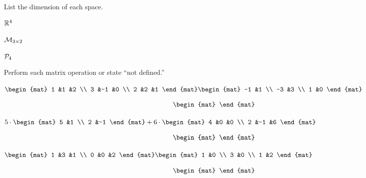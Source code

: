 \documentclass[11pt]{examjh}
\begin{document}
\begin{questions}
\question
List the dimension of each space.
\begin{parts}
\item $\mathbb{R}^4$
\item $\mathcal{M}_{3\times 2}$
\item $\mathcal{P}_4$
\begin{solution}[0.5in]

\end{solution}
\end{parts}



\question
Perform each matrix operation or state ``not defined.''
\begin{parts}
\item
$
  \begin{mat}
    1 &1  &2 \\
    3 &-1 &0 \\
    2 &2  &1
  \end{mat}
  \begin{mat}
    -1 &1 \\
    -3 &3 \\
     1 &0
  \end{mat}
  $
\begin{solution}[1.25in]
  \begin{equation*}
    \begin{mat}
    \end{mat}
  \end{equation*}
\end{solution}    
\item
$
5\cdot\begin{mat}
5 &1 \\
2 &-1
\end{mat}
+6\cdot
\begin{mat}
4 &0  &0  \\
2 &-1 &6
\end{mat}
$  
\begin{solution}[1in]
  \begin{equation*}
    \begin{mat}
    \end{mat}
  \end{equation*}
\end{solution}    
\item
$
\begin{mat}
1 &3 &1 \\
0 &0 &2
\end{mat}
\begin{mat}
1 &0 \\
3 &0 \\
1 &2
\end{mat}
$
\begin{solution}[1.25in]
  \begin{equation*}
    \begin{mat}
    \end{mat}
  \end{equation*}
\end{solution}    
\end{parts}




\end{questions}
\end{document}

